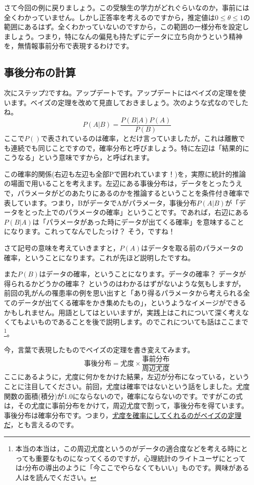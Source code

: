 \documentclass{ltjbook}
\begin{document}
さて今回の例に戻りましょう。この受験生の学力がどれぐらいなのか，事前には全くわかっていません。しかし正答率を考えるのですから，推定値は$0 \le \theta \le 1$の範囲にあるはず。全くわかっていないのですから，この範囲の一様分布を設定しましょう。つまり，特になんの偏見も持たずにデータに立ち向かうという精神を，無情報事前分布で表現するわけです。


\subsection{事後分布の計算}
次にステップ2ですね。アップデートです。アップデートにはベイズの定理を使います。ベイズの定理を改めて見直しておきましょう。次のような式なのでしたね。
\[ P(A|B) = \frac{P(B|A)P(A)}{P(B)}\]
ここで$P()$で表されているのは確率，とだけ言っていましたが，これは離散でも連続でも同じことですので，確率分布と呼びましょう。特に左辺は「結果的にこうなる」という意味ですから，と呼ばれます。

この確率的関係(右辺も左辺も全部Pで囲われています！)を，実際に統計的推論の場面で用いることを考えます。左辺にある事後分布は，データをとったうえで，パラメータがどのあたりにあるのかを推論するということを条件付き確率で表しています。つまり，BがデータでAがパラメータ，事後分布$P(A|B)$が「データをとった上でのパラメータの確率」ということです。であれば，右辺にある$P(B|A)$は「パラメータがあった時にデータが出てくる確率」を意味することになります。これってなんでしたっけ？ そう，ですね！

さて記号の意味を考えていきますと，$P(A)$はデータを取る前のパラメータの確率，ということになります。これが先ほど説明したですね。

また$P(B)$はデータの確率，ということになります。データの確率？ データが得られるかどうかの確率？ というのはわかるはずがないような気もしますが，前回の乳がんの罹患率の例を思い出すと「あり得るパラメータから考えられる全てのデータが出てくる確率をかき集めたもの」，というようなイメージができるかもしれません。用語としてはといいますが，実践上はこれについて深く考えなくてもよいものであることを後で説明します。のでこれについても話はここまで\footnote{本当の本当は，この周辺尤度というのがデータの適合度などを考える時にとっても重要なものになってくるのですが，心理統計のライトユーザにとっては$t$分布の導出のように「今ここでやらなくてもいい」ものです。興味がある人は\citet{浜田201912}を読んでください。}。

今，言葉で表現したものでベイズの定理を書き変えてみます。
\[ \mbox{事後分布} = \mbox{尤度} \times \frac{事前分布}{周辺尤度}\]
ここにあるように，尤度に何かをかけた結果，左辺が分布になっている，ということに注目してください。前回，尤度は確率ではないという話をしました。尤度関数の面積(積分)が1.0にならないので，確率にならないのです。ですがこの式は，その尤度に事前分布をかけて，周辺尤度で割って，事後分布を得ています。事後分布は確率分布です。つまり，\underline{尤度を確率にしてくれるのがベイズの定理だ}，とも言えるのです。
\end{document}

